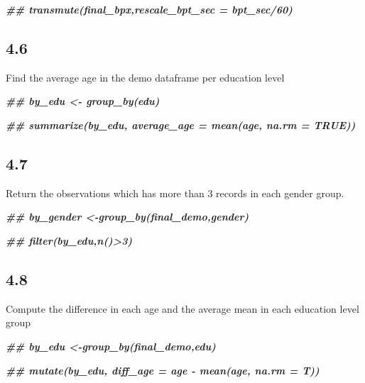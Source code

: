 \documentclass[
]{book}
\newenvironment{Shaded}{\begin{snugshade}}{\end{snugshade}}
\newcommand{\DocumentationTok}[1]{\textcolor[rgb]{0.56,0.35,0.01}{\textbf{\textit{#1}}}}
\begin{document}
\begin{Shaded}
\begin{Highlighting}[]
\DocumentationTok{\#\#  transmute(final\_bpx,rescale\_bpt\_sec = bpt\_sec/60)}
\end{Highlighting}
\end{Shaded}

\hypertarget{section-24}{%
\subsection{4.6}\label{section-24}}

Find the average age in the demo dataframe per education level

\begin{Shaded}
\begin{Highlighting}[]
\DocumentationTok{\#\#  by\_edu \textless{}{-} group\_by(edu)}

\DocumentationTok{\#\# summarize(by\_edu, average\_age = mean(age, na.rm = TRUE))}
\end{Highlighting}
\end{Shaded}

\hypertarget{section-25}{%
\subsection{4.7}\label{section-25}}

Return the observations which has more than 3 records in each gender group.

\begin{Shaded}
\begin{Highlighting}[]
\DocumentationTok{\#\# by\_gender \textless{}{-}group\_by(final\_demo,gender)}

\DocumentationTok{\#\# filter(by\_edu,n()\textgreater{}3)}
\end{Highlighting}
\end{Shaded}

\hypertarget{section-26}{%
\subsection{4.8}\label{section-26}}

Compute the difference in each age and the average mean in each education level group

\begin{Shaded}
\begin{Highlighting}[]
\DocumentationTok{\#\# by\_edu \textless{}{-}group\_by(final\_demo,edu)}

\DocumentationTok{\#\# mutate(by\_edu, diff\_age = age {-} mean(age, na.rm = T))}
\end{Highlighting}
\end{Shaded}
\end{document}
